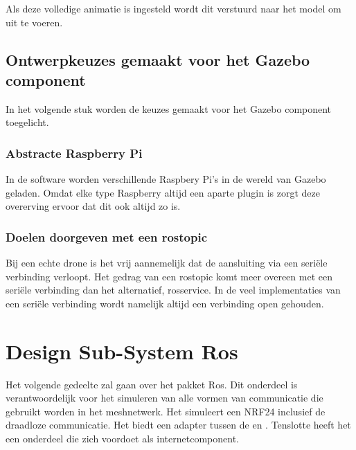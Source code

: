\documentclass[a4paper, 11pt, oneside]{report}
\begin{document}
Als deze volledige animatie is ingesteld wordt dit verstuurd naar het model om uit te voeren.    
 

\subsection{Ontwerpkeuzes gemaakt voor het Gazebo component}
\label{DetailedDesign:Gazebo:ontwerkeuzes}
In het volgende stuk worden de keuzes gemaakt voor het Gazebo component toegelicht.
\subsubsection{Abstracte Raspberry Pi}
In de software worden verschillende Raspbery Pi's in de wereld van Gazebo geladen.
Omdat elke type Raspberry altijd een aparte plugin is zorgt deze overerving ervoor dat dit ook altijd zo is.  

\subsubsection{Doelen doorgeven met een rostopic}
Bij een echte drone is het vrij aannemelijk dat de aansluiting via een seriële verbinding verloopt.
Het gedrag van een rostopic komt meer overeen met een seriële verbinding dan het alternatief, rosservice.
In de veel implementaties van een seriële verbinding wordt namelijk altijd een verbinding open gehouden. 

\section{Design Sub-System Ros}
\label{DetailedDesign:WirelessSimulatie}
Het volgende gedeelte zal gaan over het pakket Ros. Dit onderdeel is verantwoordelijk voor het simuleren van alle vormen van communicatie die gebruikt worden in het meshnetwerk. Het simuleert een NRF24 inclusief de draadloze communicatie. Het biedt een adapter tussen de  en .
Tenslotte heeft het een onderdeel die zich voordoet als internetcomponent.
\end{document}

